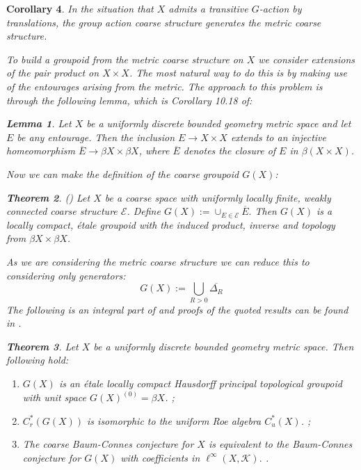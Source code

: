 \documentclass[11pt]{amsart}
\theoremstyle{plain}
\newtheorem{theorem}{Theorem}%
\newtheorem{lemma}[theorem]{Lemma}%
\newtheorem{corollary}[theorem]{Corollary}%
\theoremstyle{definition}%
\theoremstyle{remark}%
\begin{document}
\begin{corollary}
In the situation that $X$ admits a transitive $G$-action by translations, the group action coarse structure generates the metric coarse structure. 

To build a groupoid from the metric coarse structure on $X$ we consider extensions of the pair product on $X \times X$. The most natural way to do this is by making use of the entourages arising from the metric. The approach to this problem is through the following lemma, which is Corollary 10.18 of\cite{MR2007488}:

\begin{lemma}\label{Lem:CorRoe}
Let $X$ be a uniformly discrete bounded geometry metric space and let $E$ be any entourage. Then the inclusion $E \rightarrow X \times X$ extends to an injective homeomorphism $\overline{E} \rightarrow \beta X \times \beta X$, where $\overline{E}$ denotes the closure of $E$ in $\beta(X \times X)$.
\end{lemma}
Now we can make the definition of the coarse groupoid $G(X)$:
\begin{theorem}(\cite[Theorem 10.20]{MR2007488})
Let $X$ be a coarse space with uniformly locally finite, weakly connected coarse structure $\mathcal{E}$. Define $G(X):=\cup_{E\in \mathcal{E}}\overline{E}.$ Then $G(X)$ is a locally compact, \'etale groupoid with the induced product, inverse and topology from $\beta X \times \beta X$.
\end{theorem}
As we are considering the metric coarse structure we can reduce this to considering only generators:
\begin{equation*}
G(X):=\bigcup_{R>0}\overline{\Delta_{R}}
\end{equation*}
The following is an integral part of \cite{MR1905840} and proofs of the quoted results can be found in \cite{MR2007488}.
\begin{theorem}
Let $X$ be a uniformly discrete bounded geometry metric space. Then following hold:
\begin{enumerate}
\item $G(X)$ is an \'etale locally compact Hausdorff principal topological groupoid with unit space $G(X)^{(0)}=\beta X$. \cite[Theorem 10.20]{MR2007488}\cite[Proposition 3.2]{MR1905840};
\item $C^{*}_{r}(G(X))$ is isomorphic to the uniform Roe algebra $C^{*}_{u}(X)$. \cite[Proposition 10.29]{MR2007488};
\item The coarse Baum-Connes conjecture for $X$ is equivalent to the Baum-Connes conjecture for $G(X)$ with coefficients in $\ell^{\infty}(X,\mathcal{K})$. \cite[Lemma 4.7]{MR1905840}.
\end{enumerate}
\end{theorem}


\end{corollary}
\end{document}

